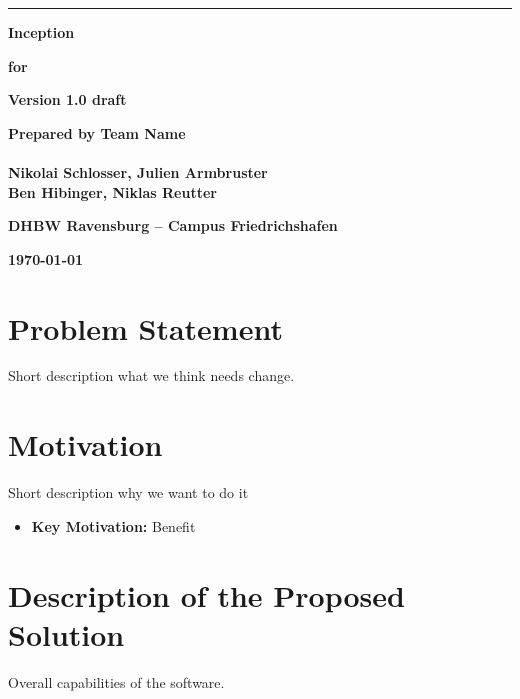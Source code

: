 \documentclass[11pt, a4paper]{article}
\newcommand{\projecttitle}{<Project Name>}
\newcommand{\docversion}{Version 1.0 draft}
\newcommand{\docauthor}{Team Name \\ \vspace{0.5em} \\ Nikolai Schlosser, Julien Armbruster\\ Ben Hibinger, Niklas Reutter}
\newcommand{\docorg}{DHBW Ravensburg -- Campus Friedrichshafen}
\newcommand{\docdate}{\today}
\begin{document}
\begin{titlepage}
    \sffamily
    \noindent\rule{\textwidth}{3pt}
    \vspace{1.2cm}
    
    \begin{flushright}
        {\fontsize{28}{34}\selectfont\bfseries Inception\par}
        \vspace{1.2cm}
        {\Large\bfseries for\par}
        \vspace{1.2cm}
        {\fontsize{24}{30}\selectfont\bfseries \projecttitle\par}
        \vspace{1.8cm}
        {\large\bfseries \docversion\par}
        \vspace{1.2cm}
        {\large\bfseries Prepared by \docauthor\par}
        \vspace{1.2cm}
        {\large\bfseries \docorg\par}
        \vspace{1.2cm}
        {\large\bfseries \docdate\par}
    \end{flushright}
\end{titlepage}

\section{Problem Statement}
Short description what we think needs change.

\section{Motivation}
Short description why we want to do it

\begin{itemize}
    \item \textbf{Key Motivation:} Benefit
\end{itemize}

\section{Description of the Proposed Solution}
Overall capabilities of the software.
\end{document}
